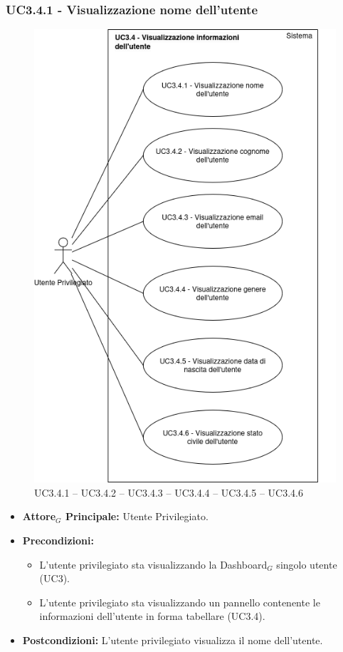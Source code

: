 \documentclass[11pt]{article}
\begin{document}
\begin{justify}
\subsubsection{\textbf{UC3.4.1 - Visualizzazione nome dell'utente}}
\begin{figure}[H]
    \centering
    \includegraphics[width=0.7\linewidth]{UC3.4.1image.png}
    \caption{UC3.4.1 -- UC3.4.2 -- UC3.4.3 -- UC3.4.4 -- UC3.4.5 -- UC3.4.6}
    \label{fig:UC3.4.1}
\end{figure}
\label{UC3.4.1}
\begin{itemize}
     \item \textbf{Attore$_G$ Principale:} Utente Privilegiato.
     \item \textbf{Precondizioni:}
        \begin{itemize}
    	\item L'utente privilegiato sta visualizzando la Dashboard$_G$ singolo utente (UC3).
          \item L'utente privilegiato sta visualizzando un pannello contenente le informazioni dell'utente in forma tabellare (UC3.4).
        \end{itemize}
      \item \textbf{Postcondizioni:} L'utente privilegiato visualizza il nome dell'utente. 

\end{itemize}
\end{justify}
\end{document}
